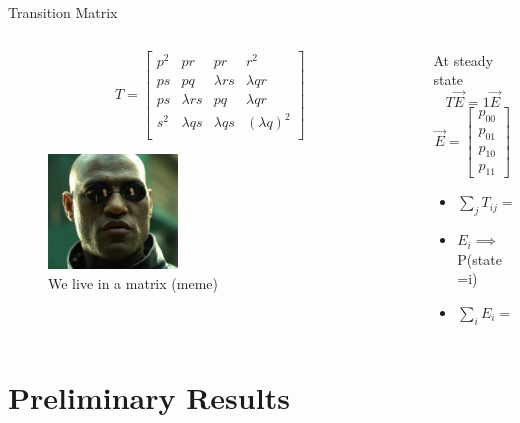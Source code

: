 \documentclass[aspectratio=169,9pt]{beamer}
\begin{document}
\begin{frame}{Transition Matrix}
  \begin{columns}
    \begin{column}{0.6\textwidth}
      \[ T =
      \begin{bmatrix}
              p^2 & pr & pr & r^2 \\
              ps & pq & \lambda rs & \lambda qr \\
              ps & \lambda rs & pq & \lambda qr \\
              s^2 & \lambda qs & \lambda qs & (\lambda q)^2 \\
      \end{bmatrix}
      \]
      \begin{figure}
        \centering
        \includegraphics[width=0.4\textwidth]{matrix_meme}
        \caption{We live in a matrix (meme)}
      \end{figure}
    \end{column}
    \begin{column}{0.4\textwidth}
      \pause
      At steady state
      $$ T\vec{E} = 1 \vec{E}$$
      $$ \vec{E} = \begin{bmatrix}p_{00} \\ p_{01} \\ p_{10} \\ p_{11} \end{bmatrix}$$
      \begin{itemize}
        \item $\sum_j T_{ij} = 1 \quad \forall i$
        \item $E_i \implies$  P(state=i)
        \item $\sum_i E_{i} = 1$
      \end{itemize}
    \end{column}
  \end{columns}
\end{frame}

\section{Preliminary Results}
\end{document}
